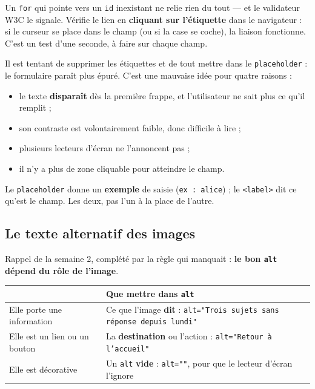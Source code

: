 \documentclass[a4paper,11pt]{article}
\newcommand{\hdr}[1]{\multicolumn{1}{l}{\color{white}\bfseries #1}}
\renewcommand{\arraystretch}{1.3}
\begin{document}
\begin{tcolorbox}[attention, title={\texttt{for} doit reprendre \texttt{id}, pas \texttt{name}}]
Un \texttt{for} qui pointe vers un \texttt{id} inexistant ne relie rien du tout --- et le validateur W3C le signale. Vérifie le lien en \textbf{cliquant sur l'étiquette} dans le navigateur : si le curseur se place dans le champ (ou si la case se coche), la liaison fonctionne. C'est un test d'une seconde, à faire sur chaque champ.
\end{tcolorbox}

\begin{tcolorbox}[interdit, title={Un \texttt{placeholder} n'est pas un \texttt{<label>}}]
Il est tentant de supprimer les étiquettes et de tout mettre dans le \texttt{placeholder} : le formulaire paraît plus épuré. C'est une mauvaise idée pour quatre raisons :

\begin{itemize}
  \item le texte \textbf{disparaît} dès la première frappe, et l'utilisateur ne sait plus ce qu'il remplit ;
  \item son contraste est volontairement faible, donc difficile à lire ;
  \item plusieurs lecteurs d'écran ne l'annoncent pas ;
  \item il n'y a plus de zone cliquable pour atteindre le champ.
\end{itemize}

Le \texttt{placeholder} donne un \textbf{exemple} de saisie (\texttt{ex : alice}) ; le \texttt{<label>} dit ce qu'est le champ. Les deux, pas l'un à la place de l'autre.
\end{tcolorbox}

\subsection{Le texte alternatif des images}

Rappel de la semaine 2, complété par la règle qui manquait : \textbf{le bon \texttt{alt} dépend du rôle de l'image}.

\begin{center}
\renewcommand{\arraystretch}{1.0}
\begin{tabularx}{\linewidth}{p{3.4cm}X}
  \toprule
  \rowcolor{uniNavy}
  \hdr{Rôle de l'image} & \hdr{Que mettre dans \texttt{alt}} \\
  \midrule
  \rowcolor{uniPaper}
  Elle porte une information & Ce que l'image \textbf{dit} : \texttt{alt="Trois sujets sans réponse depuis lundi"} \\
  Elle est un lien ou un bouton & La \textbf{destination} ou l'action : \texttt{alt="Retour à l'accueil"} \\
  \rowcolor{uniPaper}
  Elle est décorative & Un \texttt{alt} \textbf{vide} : \texttt{alt=""}, pour que le lecteur d'écran l'ignore \\
  \bottomrule
\end{tabularx}
\end{center}
\end{document}
